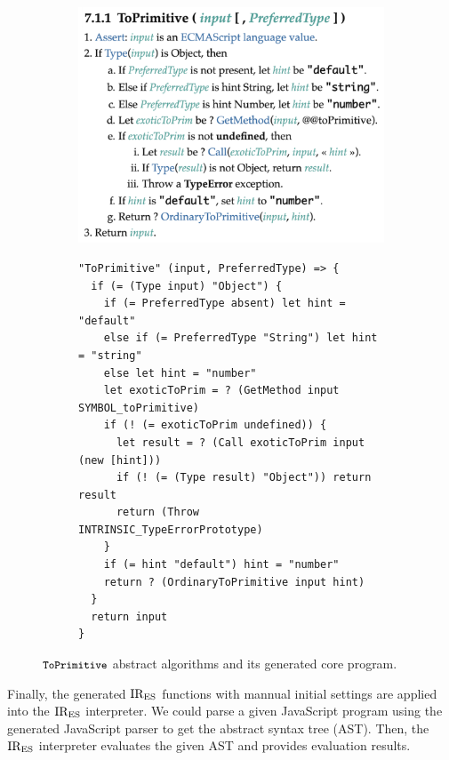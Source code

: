\begin{figure}[t]
  \centering
  \begin{subfigure}{0.4\textwidth}
    \includegraphics[width=\textwidth]{img/to_primitive.png}
    \label{fig:to-primitive-es}
  \end{subfigure}
  \qquad
  \begin{subfigure}{0.48\textwidth}
    \begin{lstlisting}[style=ires]
"ToPrimitive" (input, PreferredType) => {
  if (= (Type input) "Object") {
    if (= PreferredType absent) let hint = "default"
    else if (= PreferredType "String") let hint = "string"
    else let hint = "number"
    let exoticToPrim = ? (GetMethod input SYMBOL_toPrimitive)
    if (! (= exoticToPrim undefined)) {
      let result = ? (Call exoticToPrim input (new [hint]))
      if (! (= (Type result) "Object")) return result
      return (Throw INTRINSIC_TypeErrorPrototype)
    }
    if (= hint "default") hint = "number"
    return ? (OrdinaryToPrimitive input hint)
  }
  return input
}
    \end{lstlisting}
    \label{fig:to-primitive-ires}
  \end{subfigure}
  \caption{\( \texttt{\small ToPrimitive} \) abstract algorithms
  and its generated core program.}
  \label{fig:to-primitive}
\end{figure}

Finally, the generated \( \text{IR}_\text{ES} \) functions with mannual initial settings
are applied into the \( \text{IR}_\text{ES} \) interpreter. We could parse a
given JavaScript program using the generated JavaScript parser
to get the abstract syntax tree (AST). Then, the \( \text{IR}_\text{ES} \) interpreter
evaluates the given AST and provides evaluation results.

